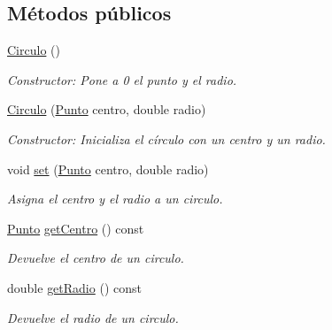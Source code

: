 \subsection*{Métodos públicos}
\begin{DoxyCompactItemize}
\item 
\mbox{\label{classCirculo_a6933bf908b78a4167684081a3a8f257f}} 
\hyperlink{classCirculo_a6933bf908b78a4167684081a3a8f257f}{Circulo} ()
\begin{DoxyCompactList}\small\item\em Constructor\+: Pone a 0 el punto y el radio. \end{DoxyCompactList}\item 
\mbox{\label{classCirculo_ad4c6c76f0227c25afcb872a8744ebe56}} 
\hyperlink{classCirculo_ad4c6c76f0227c25afcb872a8744ebe56}{Circulo} (\hyperlink{classPunto}{Punto} centro, double radio)
\begin{DoxyCompactList}\small\item\em Constructor\+: Inicializa el círculo con un centro y un radio. \end{DoxyCompactList}\item 
\mbox{\label{classCirculo_aa24cc4b316a3d9ece35f120d9b8e1fc4}} 
void \hyperlink{classCirculo_aa24cc4b316a3d9ece35f120d9b8e1fc4}{set} (\hyperlink{classPunto}{Punto} centro, double radio)
\begin{DoxyCompactList}\small\item\em Asigna el centro y el radio a un circulo. \end{DoxyCompactList}\item 
\mbox{\label{classCirculo_a54f31597372c19c1cfa779ab17c8e99d}} 
\hyperlink{classPunto}{Punto} \hyperlink{classCirculo_a54f31597372c19c1cfa779ab17c8e99d}{get\+Centro} () const
\begin{DoxyCompactList}\small\item\em Devuelve el centro de un circulo. \end{DoxyCompactList}\item 
\mbox{\label{classCirculo_ae6eb1c38f2f2802a10d130c87caca383}} 
double \hyperlink{classCirculo_ae6eb1c38f2f2802a10d130c87caca383}{get\+Radio} () const
\begin{DoxyCompactList}\small\item\em Devuelve el radio de un circulo. \end{DoxyCompactList}\item 

\end{DoxyCompactItemize}
